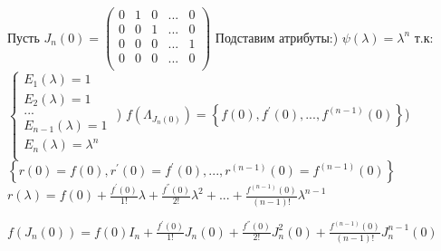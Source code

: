 \documentclass{article}
\begin{document}
    Пусть \(J_{n} (0) = \begin{pmatrix}
    0 & 1 & 0 & ... & 0 \\
    0 & 0 & 1 & ... & 0 \\
    0 & 0 & 0 & ... & 1 \\
    0 & 0 & 0 & ... & 0 \\
    \end{pmatrix}\)
    \newline
    Подставим атрибуты:) \(\psi (\lambda) = \lambda^{n}\)\newline
    т.к:    
    \(\left\{\begin{matrix}
    E_{1} (\lambda) = 1\\
    E_{2} (\lambda) = 1 \\
    ... \\
    E_{n-1} (\lambda) = 1 \\
    E_{n} (\lambda) = \lambda ^{n} \\
    \end{matrix}\right.
    \)
    \newline{}) \(f(\Lambda_{J_{n} (0)}) = \left\{ f(0), f^{'}(0),...,f^{(n-1)}(0)\right\}\)\newline{}) \(\left\{ r(0) = f(0), r^{'}(0) = f^{'}(0),..., r^{(n-1)}(0) = f^{(n-1)}(0) \right\}\)\newline\newline
  \(  r(\lambda) = f(0) + \frac{f^{'}(0)}{1!}\lambda + \frac{f^{''}(0)}{2!}\lambda^{2} + ... + \frac{f^{(n-1)}(0)}{(n-1)!}\lambda^{n-1}\)\newline
    
   \( f(J_{n}(0)) = f(0)I_{n} + \frac{f^{'}(0)}{1!}J_{n}(0) + \frac{f^{''}(0)}{2!}J_{n}^{2}(0) + \frac{f^{(n-1)}(0)}{(n-1)!}J_{n}^{n-1}(0)\)\newline
    
\end{document}
